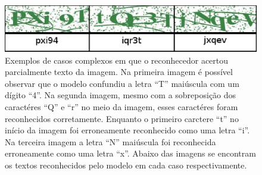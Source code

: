 \begin{figure}[H]
\centering
\includegraphics[scale=0.8]{imagens/harder_cases}
\caption{Exemplos de casos complexos em que o reconhecedor acertou
  parcialmente texto da imagem. Na primeira imagem é possível observar
  que o modelo confundiu a letra ``T'' maiúscula com um dígito ``4''.
  Na segunda imagem, mesmo com a sobreposição dos caractéres ``Q'' e
  ``r'' no meio da imagem, esses caractéres foram reconhecidos
  corretamente. Enquanto o primeiro carctere ``t'' no início da imagem
  foi erroneamente reconhecido como uma letra ``i''. Na terceira
  imagem a letra ``N'' maiúscula foi reconhecida erroneamente como uma
  letra ``x''. Abaixo das imagens se encontram os textos reconhecidos
  pelo modelo em cada caso respectivamente.}
\label{fig:harder_cases}
\end{figure}
